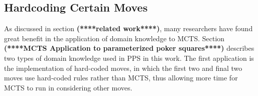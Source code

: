\documentclass[letterpaper]{article}
\begin{document}
%
%



\subsection{Hardcoding Certain Moves}

As discussed in section {\bf (****related work****)}, many researchers have found great benefit in the application of domain knowledge to MCTS. Section {\bf (****MCTS Application to parameterized poker squares****)} describes two types of domain knowledge used in PPS in this work. The first application is the implementation of hard-coded moves, in which the first two and final two moves use hard-coded rules rather than MCTS, thus allowing more time for MCTS to run in considering other moves.

\end{document}
